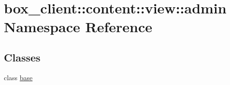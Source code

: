 \hypertarget{namespacebox__client_1_1content_1_1view_1_1admin}{
\section{box\_\-client::content::view::admin Namespace Reference}
\label{namespacebox__client_1_1content_1_1view_1_1admin}
}
\subsection*{Classes}
\begin{DoxyCompactItemize}
\item 
class \hyperlink{classbox__client_1_1content_1_1view_1_1admin_1_1base}{base}
\end{DoxyCompactItemize}
